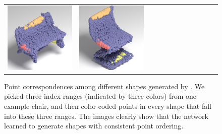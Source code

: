 \begin{figure}[t]
\begin{tabular}{cccccccccccc}
\includegraphics[width=.083\linewidth]{MRTNet/rendering/selected/corresp/m11.png} &
\includegraphics[width=.083\linewidth]{MRTNet/rendering/selected/corresp/m12.png} 
\end{tabular}
\vspace{-8pt}
    \caption{\small \label{fig:corresp} Point correspondences among different shapes generated by \mrvae. 
	We picked three index ranges (indicated by three colors) from one example chair, and then color coded points in every shape that fall into these three ranges. 
	The images clearly show that the network learned to generate shapes with consistent point ordering.
    }
    \vspace{-4pt}
\end{figure}

